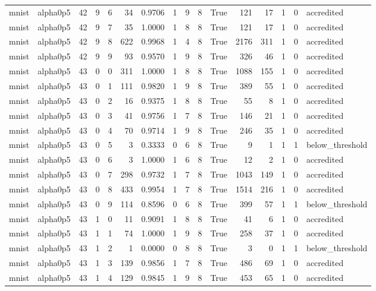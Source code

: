 \begin{tabular}{llrrrrrrrrrrrrrl}
mnist & alpha0p5 & 42 & 9 & 6 & 34 & 0.9706 & 1 & 9 & 8 & True & 121 & 17 & 1 & 0 & accredited \\
mnist & alpha0p5 & 42 & 9 & 7 & 35 & 1.0000 & 1 & 8 & 8 & True & 121 & 17 & 1 & 0 & accredited \\
mnist & alpha0p5 & 42 & 9 & 8 & 622 & 0.9968 & 1 & 4 & 8 & True & 2176 & 311 & 1 & 0 & accredited \\
mnist & alpha0p5 & 42 & 9 & 9 & 93 & 0.9570 & 1 & 9 & 8 & True & 326 & 46 & 1 & 0 & accredited \\
mnist & alpha0p5 & 43 & 0 & 0 & 311 & 1.0000 & 1 & 8 & 8 & True & 1088 & 155 & 1 & 0 & accredited \\
mnist & alpha0p5 & 43 & 0 & 1 & 111 & 0.9820 & 1 & 9 & 8 & True & 389 & 55 & 1 & 0 & accredited \\
mnist & alpha0p5 & 43 & 0 & 2 & 16 & 0.9375 & 1 & 8 & 8 & True & 55 & 8 & 1 & 0 & accredited \\
mnist & alpha0p5 & 43 & 0 & 3 & 41 & 0.9756 & 1 & 7 & 8 & True & 146 & 21 & 1 & 0 & accredited \\
mnist & alpha0p5 & 43 & 0 & 4 & 70 & 0.9714 & 1 & 9 & 8 & True & 246 & 35 & 1 & 0 & accredited \\
mnist & alpha0p5 & 43 & 0 & 5 & 3 & 0.3333 & 0 & 6 & 8 & True & 9 & 1 & 1 & 1 & below\_threshold \\
mnist & alpha0p5 & 43 & 0 & 6 & 3 & 1.0000 & 1 & 6 & 8 & True & 12 & 2 & 1 & 0 & accredited \\
mnist & alpha0p5 & 43 & 0 & 7 & 298 & 0.9732 & 1 & 7 & 8 & True & 1043 & 149 & 1 & 0 & accredited \\
mnist & alpha0p5 & 43 & 0 & 8 & 433 & 0.9954 & 1 & 7 & 8 & True & 1514 & 216 & 1 & 0 & accredited \\
mnist & alpha0p5 & 43 & 0 & 9 & 114 & 0.8596 & 0 & 6 & 8 & True & 399 & 57 & 1 & 1 & below\_threshold \\
mnist & alpha0p5 & 43 & 1 & 0 & 11 & 0.9091 & 1 & 8 & 8 & True & 41 & 6 & 1 & 0 & accredited \\
mnist & alpha0p5 & 43 & 1 & 1 & 74 & 1.0000 & 1 & 9 & 8 & True & 258 & 37 & 1 & 0 & accredited \\
mnist & alpha0p5 & 43 & 1 & 2 & 1 & 0.0000 & 0 & 8 & 8 & True & 3 & 0 & 1 & 1 & below\_threshold \\
mnist & alpha0p5 & 43 & 1 & 3 & 139 & 0.9856 & 1 & 7 & 8 & True & 486 & 69 & 1 & 0 & accredited \\
mnist & alpha0p5 & 43 & 1 & 4 & 129 & 0.9845 & 1 & 9 & 8 & True & 453 & 65 & 1 & 0 & accredited \\

\end{tabular}
